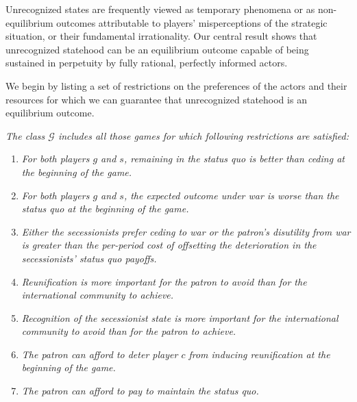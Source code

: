 Unrecognized states are frequently viewed as temporary phenomena or as non-equilibrium outcomes attributable to players' misperceptions of the strategic situation, or their fundamental irrationality. Our central result shows that unrecognized statehood can be an equilibrium outcome capable of being sustained in perpetuity by fully rational, perfectly informed actors. 

We begin by listing a set of restrictions on the preferences of the actors and their resources for which we can guarantee that unrecognized statehood is an equilibrium outcome.

\begin{definition}
\emph{The class $\mathcal{G}$ includes all those games for which following restrictions are satisfied:}

\begin{enumerate}
\item \textit{For both players $g$ and $s$, remaining in the status quo is better than ceding at the beginning of the game.}\label{res:1}

\item \textit{For both players $g$ and $s$, the expected outcome under war is worse than the status quo at the beginning of the game.}\label{res:2}

\item \textit{Either the secessionists prefer ceding to war or the patron's disutility from war is greater than the per-period cost of offsetting the deterioration in the secessionists' status quo payoffs.}\label{res:new}

\item \textit{Reunification is more important for the patron to avoid than for the international community to achieve.}\label{res:3}

\item  \textit{Recognition of the secessionist state is more important for the international community to avoid than for the patron to achieve.}\label{res:4}

\item  \textit{The patron can afford to deter player $c$ from inducing reunification at the beginning of the game.}\label{res:5}

\item \textit{The patron can afford to pay to maintain the status quo.}\label{res:6}

\end{enumerate}
\end{definition}

